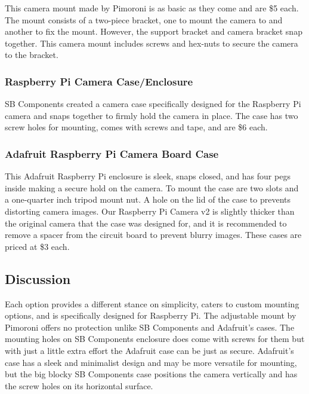 \documentclass[letterpaper,10pt,serif,draftclsnofoot,onecolumn,compsoc,titlepage]{IEEEtran}
\begin{document}
This camera mount made by Pimoroni is as basic as they come and are \$5 each. The mount 
consists of a two-piece bracket, one to mount the camera to and another to fix the 
mount. However, the support bracket and camera bracket snap together. This camera 
mount includes screws and hex-nuts to secure the camera to the bracket\cite{AdjCamMt}. \\

\subsubsection{Raspberry Pi Camera Case/Enclosure}

SB Components created a camera case specifically designed for the Raspberry Pi camera 
and snaps together to firmly hold the camera in place. The case has two screw holes for 
mounting, comes with screws and tape, and are \$6 each\cite{BlueCase}. \\

\subsubsection{Adafruit Raspberry Pi Camera Board Case}

This Adafruit Raspberry Pi enclosure is sleek, snaps closed, and has four pegs inside making a 
secure hold on the camera. To mount the case are two slots and a 
one-quarter inch tripod mount nut. A hole on the lid of the case to prevents 
distorting camera images. Our Raspberry Pi Camera v2 is slightly thicker than the 
original camera that the case was designed for, and it is recommended to remove a spacer from 
the circuit board to prevent blurry images. These cases are priced at \$3 each\cite{adafruitCase}.\\

\subsection{Discussion}

Each option provides a different stance on simplicity, caters to custom mounting 
options, and is specifically designed for Raspberry Pi. The adjustable mount 
by Pimoroni offers no protection unlike SB Components and Adafruit's cases. The 
mounting holes on SB Components enclosure does come with screws for them but with 
just a little extra effort the Adafruit case can be just as secure. Adafruit's 
case has a sleek and minimalist design and may be more versatile for mounting, but 
the big blocky SB Components case positions the camera vertically and has the 
screw holes on its horizontal surface. \\
\end{document}
